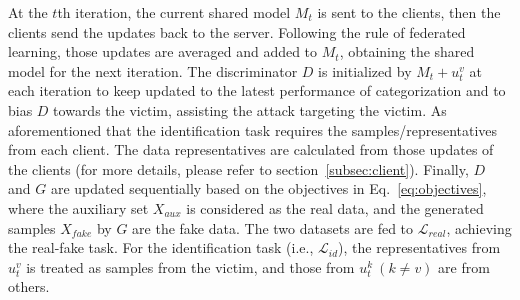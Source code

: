 \documentclass[10pt, conference, letterpaper]{IEEEtran}
\begin{document}
At the $t$th iteration, the current shared model $M_t$ is sent to the clients, then the clients send the updates back to the server. Following the rule of federated learning, those updates are averaged and added to $M_t$, obtaining the shared model for the next iteration. The discriminator $D$ is initialized by $M_t+u_t^v$ at each iteration to keep updated to the latest performance of categorization and to bias $D$ towards the victim, assisting the attack targeting the victim. As aforementioned that the identification task requires the samples/representatives from each client. The data representatives are calculated from those updates of the clients (for more details, please refer to section~\ref{subsec:client}). Finally, $D$ and $G$ are updated sequentially based on the objectives in Eq.~\ref{eq:objectives}, where the auxiliary set $X_{aux}$ is considered as the real data, and the generated samples $X_{fake}$ by $G$ are the fake data. The two datasets are fed to $\mathcal{L}_{real}$, achieving the real-fake task.
For the identification task (i.e., $\mathcal{L}_{id}$),
the representatives from $u_t^v$ is treated as samples from the victim, and those from $u_t^k~(k \ne v)$ are from others.
\end{document}
